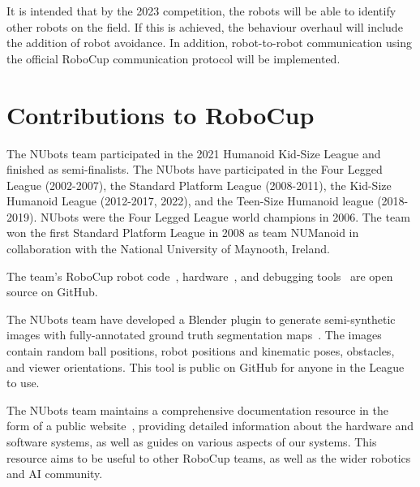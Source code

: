\documentclass{llncs}
\begin{document}
It is intended that by the 2023 competition, the robots will be able to identify other robots on the field. If this is achieved, the behaviour overhaul will include the addition of robot avoidance. In addition, robot-to-robot communication using the official RoboCup communication protocol will be implemented.

\medskip

\section{Contributions to RoboCup}


The NUbots team participated in the 2021 Humanoid Kid-Size League and finished as semi-finalists. The NUbots have participated in the Four Legged League (2002-2007), the Standard Platform League (2008-2011), the Kid-Size Humanoid League (2012-2017, 2022), and the Teen-Size Humanoid league (2018-2019). NUbots were the Four Legged League world champions in 2006. The team won the first Standard Platform League in 2008 as team NUManoid in collaboration with the National University of Maynooth, Ireland.

The team's RoboCup robot code~\cite{nubotsGit}, hardware~\cite{nubotsHardwareGit}, and debugging tools~\cite{nubotsNUsightGit} are open source on GitHub. 

The NUbots team have developed a Blender plugin to generate semi-synthetic images with fully-annotated ground truth segmentation maps~\cite{nubotsNUpbrGit}. The images contain random ball positions, robot positions and kinematic poses, obstacles, and viewer orientations. This tool is public on GitHub for anyone in the League to use.

The NUbots team maintains a comprehensive documentation resource in the form of a public website~\cite{nubotsNUbookGit}, providing detailed information about the hardware and software systems, as well as guides on various aspects of our systems. This resource aims to be useful to other RoboCup teams, as well as the wider robotics and AI community.





\end{document}
